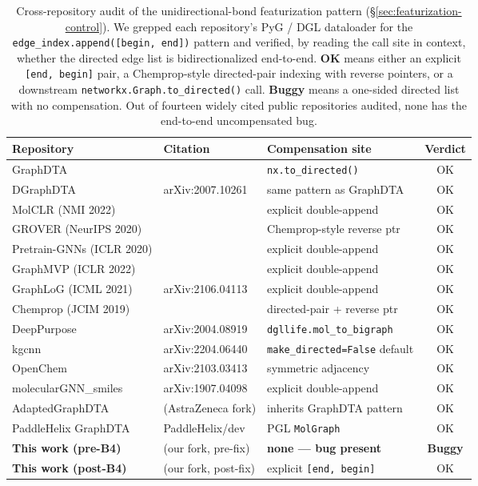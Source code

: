 \documentclass[sigconf,nonacm,anonymous,review]{acmart}
\begin{document}
\begin{table}[t]
\centering
\caption{Cross-repository audit of the unidirectional-bond featurization
pattern (\S\ref{sec:featurization-control}). We grepped each repository's
PyG / DGL dataloader for the
\texttt{edge\_index.append([begin,\,end])} pattern and verified, by
reading the call site in context, whether the directed edge list is
bidirectionalized end-to-end. \textbf{OK} means either an
explicit \texttt{[end,\,begin]} pair, a Chemprop-style directed-pair
indexing with reverse pointers, or a downstream
\texttt{networkx.Graph.to\_directed()} call. \textbf{Buggy} means a
one-sided directed list with no compensation. Out of fourteen widely
cited public repositories audited, none has the end-to-end uncompensated
bug.}
\label{tab:repo_audit}
\small
\begin{tabular}{lllc}
\toprule
Repository & Citation & Compensation site & Verdict \\
\midrule
GraphDTA & \cite{nguyen2021graphdta} & \texttt{nx.to\_directed()} & OK \\
DGraphDTA & arXiv:2007.10261 & same pattern as GraphDTA & OK \\
MolCLR (NMI 2022) & \cite{wang2022molclr} & explicit double-append & OK \\
GROVER (NeurIPS 2020) & \cite{rong2020grover} & Chemprop-style reverse ptr & OK \\
Pretrain-GNNs (ICLR 2020) & \cite{hu2020pretrain} & explicit double-append & OK \\
GraphMVP (ICLR 2022) & \cite{liu2022graphmvp} & explicit double-append & OK \\
GraphLoG (ICML 2021) & arXiv:2106.04113 & explicit double-append & OK \\
Chemprop (JCIM 2019) & \cite{yang2019chemprop} & directed-pair + reverse ptr & OK \\
DeepPurpose & arXiv:2004.08919 & \texttt{dgllife.mol\_to\_bigraph} & OK \\
kgcnn & arXiv:2204.06440 & \texttt{make\_directed=False} default & OK \\
OpenChem & arXiv:2103.03413 & symmetric adjacency & OK \\
molecularGNN\_smiles & arXiv:1907.04098 & explicit double-append & OK \\
AdaptedGraphDTA & (AstraZeneca fork) & inherits GraphDTA pattern & OK \\
PaddleHelix GraphDTA & PaddleHelix/dev & PGL \texttt{MolGraph} & OK \\
\midrule
\textbf{This work (pre-B4)} & (our fork, pre-fix) & \textbf{none --- bug present} & \textbf{Buggy} \\
\textbf{This work (post-B4)} & (our fork, post-fix) & explicit \texttt{[end,\,begin]} & OK \\
\bottomrule
\end{tabular}
\end{table}
\end{document}
